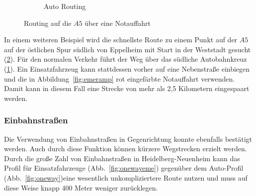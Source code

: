 \begin{figure}[htb]
\begin{subfigure}{0.49\textwidth}
\caption{Auto Routing}
\label{fig:normalramp}
\end{subfigure}
\caption{Routing auf die $A5$ über eine Notauffahrt}
\label{fig:ramp}
\end{figure}

In einem weiteren Beispiel wird die schnellste Route zu einem Punkt auf der $A5$ auf der östlichen Spur südlich von Eppelheim mit Start in der Weststadt gesucht (\ref{fig:ramp}).
Für den normalen Verkehr führt der Weg über das südliche Autobahnkreuz (\ref{fig:normalramp}).
Ein Einsatzfahrzeug kann stattdessen vorher auf eine Nebenstraße einbiegen und die in Abbildung~\ref{fig:emeramp} rot eingefärbte Notauffahrt verwenden.
Damit kann in diesem Fall eine Strecke von mehr als 2,5 Kilometern eingespaart werden.

\subsubsection{Einbahnstraßen}

Die Verwendung von Einbahnstraßen in Gegenrichtung konnte ebenfalls bestätigt werden.
Auch durch diese Funktion können kürzere Wegstrecken erzielt werden. 
Durch die große Zahl von Einbahnstraßen in Heidelberg-Neuenheim kann das Profil für Einsatzfahrzeuge (Abb.~\ref{fig:onewayeme}) gegenüber dem Auto-Profil (Abb.~\ref{fig:oneway})eine wesentlich unkompliziertere Route nutzen und muss auf diese Weise knapp 400 Meter weniger zurücklegen.

